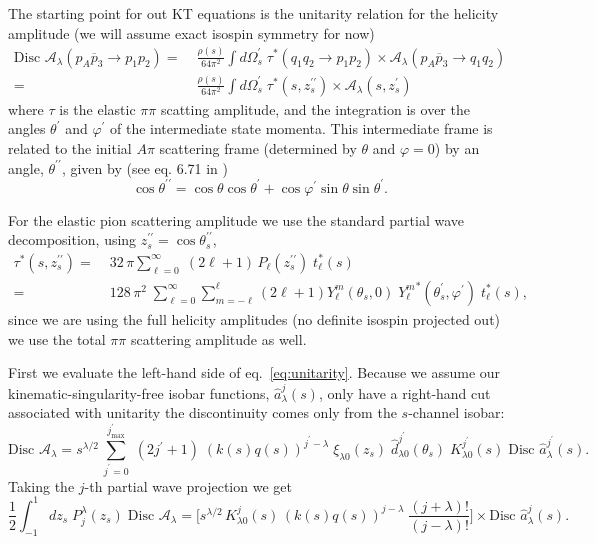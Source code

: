 \documentclass[10pt, aps,prd,amsmath,amssymb,superscriptaddress,onecolumn,
nofootinbib,showpacs,preprintnumbers]{revtex4-1}
\newcommand{\jpmax}{{j^\prime_\text{max}}}
\newcommand{\Disc}{\text{Disc }}
\begin{document}
The starting point for out KT equations is the unitarity relation for the helicity amplitude (we will assume exact isospin symmetry for now)
  \begin{align}
    \label{eq:unitarity}
    \Disc \mathcal{A}_\lambda(p_A \overline{p}_3 \to p_1 p_2 ) =&\; \frac{\rho(s)}{64 \pi^2} \int d\Omega_s^\prime  \; \tau^*(q_1q_2 \to p_1p_2) \times \mathcal{A}_\lambda(p_A \overline{p}_{3} \to q_1 q_2 ) \nonumber \\
    =& \; \frac{\rho(s)}{64 \pi^2} \int d\Omega_s^\prime  \; \tau^*(s,z_s^{\prime\prime}) \times \mathcal{A}_\lambda(s,z_s^{\prime})
  \end{align}
where \(\tau\) is the elastic \(\pi\pi\) scatting amplitude, and the integration is over the angles \(\theta^\prime\) and \(\varphi^\prime\) of the intermediate state momenta. This intermediate frame is related to the initial \(A\pi\) scattering frame (determined by \(\theta\) and \(\varphi = 0\)) by an angle, \(\theta^{\prime\prime}\), given by (see eq. 6.71 in \cite{MS})
  \begin{equation}
    \cos \theta^{\prime\prime} = \cos \theta \cos \theta^\prime + \cos \varphi^\prime \sin\theta \sin \theta^\prime.
  \end{equation}

For the elastic pion scattering amplitude we use the standard partial wave decomposition, using \( z_s^{\prime\prime} = \cos \theta_s^{\prime\prime}\),
  \begin{align}
    \label{eq:elastic-pion}
    \tau^*(s, z_s^{\prime\prime}) =& \; 32 \, \pi \sum_{\ell=0  }^\infty \; (2\ell+1) \, P_{\ell}(z_s^{\prime\prime}) \; t_\ell^*(s) \nonumber \\
    =& \; 128 \, \pi^2 \; \sum_{\ell=0}^\infty \sum_{m=-\ell}^{\ell} (2\ell +1 ) Y^m_\ell(\theta_s,0) \; {Y^m_\ell}^*(\theta_s^\prime, \varphi^\prime) \; t_\ell^*(s),
  \end{align}
since we are using the full helicity amplitudes (no definite isospin projected out) we use the total \(\pi\pi\) scattering amplitude as well.

First we evaluate the left-hand side of eq.~\ref{eq:unitarity}. Because we assume our kinematic-singularity-free isobar functions, \(\hat{a}_\lambda^j(s)\), only have a right-hand cut associated with unitarity the discontinuity comes only from the \(s\)-channel isobar:
  \begin{equation}
    \label{eq:discontinuity}
    \Disc \mathcal{A}_\lambda = s^{\lambda/2}\, \sum_{j^\prime=0}^\jpmax \; (2 j^\prime +1) \; (k(s)q(s))^{j^\prime-\lambda}  \; \xi_{\lambda 0}(z_s)
    \; \hat{d}^{j^\prime}_{\lambda 0}(\theta_s) \; K^{j^\prime}_{\lambda0}(s) \; \Disc \hat{a}_\lambda^{j^\prime}(s).
  \end{equation}
Taking the \(j\)-th partial wave projection we get
  \begin{equation}
    \label{eq:pw-disc}
    \frac{1}{2} \int_{-1}^1 dz_s \; P^\lambda_{j}(z_s) \; \Disc \mathcal{A}_\lambda =
    \bigg[ s^{\lambda/2} \, K^j_{\lambda 0}(s) \, (k(s)q(s))^{j-\lambda} \; \frac{(j+\lambda)!}{(j-
    \lambda)!} \bigg] \times \Disc \hat{a}^j_\lambda(s).
  \end{equation}
\end{document}
